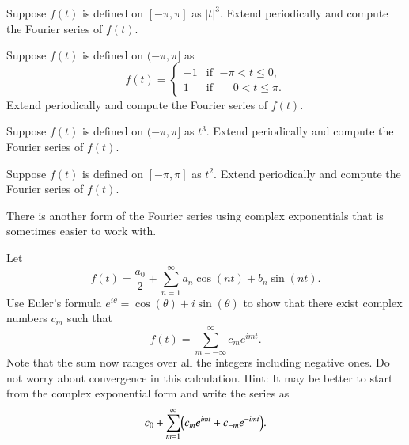 \begin{exercise}
Suppose $f(t)$ is defined on $[-\pi,\pi]$ as $\lvert t \rvert^3$.
Extend periodically and compute the Fourier series of $f(t)$.
\end{exercise}

\begin{exercise}
Suppose $f(t)$ is defined on $(-\pi,\pi]$ as
\begin{equation*}
f(t) =
\begin{cases}
-1 & \text{if } \; {-\pi} < t \leq 0 , \\
1 & \text{if } \; \phantom{-}0 < t \leq \pi .
\end{cases}
\end{equation*}
Extend periodically and compute the Fourier series of $f(t)$.
\end{exercise}

\begin{exercise}
Suppose $f(t)$ is defined on $(-\pi,\pi]$ as $t^3$.
Extend periodically and compute the Fourier series of $f(t)$.
\end{exercise}

\begin{exercise}
Suppose $f(t)$ is defined on $[-\pi,\pi]$ as $t^2$.
Extend periodically and compute the Fourier series of $f(t)$.
\end{exercise}

There is another form of the Fourier series using complex exponentials
that is sometimes easier to work with.

\begin{exercise}
Let 
\begin{equation*}
f(t) = \frac{a_0}{2} + \sum_{n=1}^\infty a_n \cos (n t)
+ b_n \sin (n t) .
\end{equation*}
Use Euler's formula $e^{i\theta} = \cos (\theta) + i \sin (\theta)$ to
show that there exist complex numbers $c_m$ such that
\begin{equation*}
f(t) = 
\sum_{m=-\infty}^\infty c_m e^{imt} .
\end{equation*}
Note that the sum now ranges over all the integers including negative ones.
Do not worry about convergence in this calculation.
Hint: It may be better to start from the complex exponential form and write
the series as
\begin{equation*}
c_0 + \sum_{m=1}^\infty \Bigl( c_m e^{imt} + c_{-m} e^{-imt}  \Bigr).
\end{equation*}
\end{exercise}

